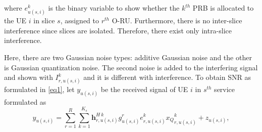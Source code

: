 \documentclass[lettersize,journal]{IEEEtran}
\begin{document}
where $e^{k}_{u(s,i)}$ is the binary variable to show whether the $k^{th}$ PRB is allocated to the UE $i$ in slice $s$, assigned to $r^{th}$ O-RU. %
Furthermore, there is no inter-slice interference since slices are isolated. Therefore, there exist only intra-slice interference.

Here, there are two Gaussian noise types: additive Gaussian noise and the other is Gaussian quantization noise. The second noise is added to the interfering signal and shown with $ I_{r,u(s,i)}^{k}$ and it is different with interference.
To obtain SNR as formulated in \eqref{eq1}, let $y_{u(s,i)} $ be the received signal of UE $i$ in $s^{th}$ service formulated as
\begin{equation}\label{eq2}
y_{u(s,i)} = \sum_{r = 1}^{R}\sum_{k=1}^{K_s} \boldsymbol{h}^{H \: k}_{r,u(s,i)} g_{u(s,i)}^r e^k_{r,u(s,i)}{x_Q}^k_{r,u(s,i)}+ z_{u(s,i)},
\end{equation}
\end{document}
